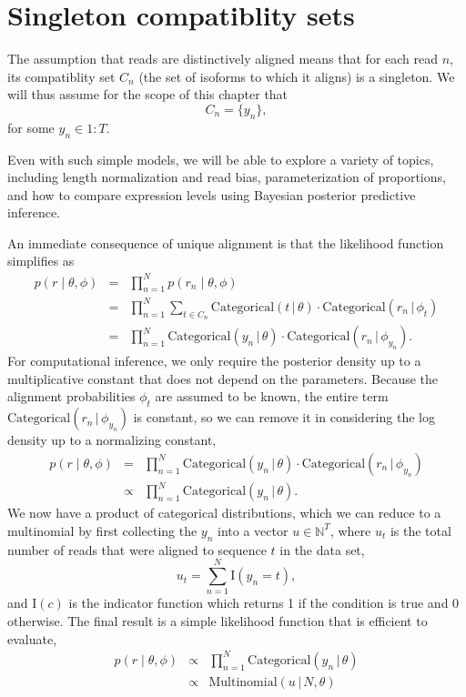 \documentclass[11pt]{report}
\newcommand{\rngto}[1]{1{:}#1}
\newcommand{\setlist}[1]{\{ #1 \}}
\newcommand{\indicator}[1]{\textrm{I}\!\left( #1 \right)}
\newcommand{\distro}[3]{\textrm{#1}\!\left( #2 \,|\, #3\right)}
\begin{document}
\section{Singleton compatiblity sets}

The assumption that reads are distinctively aligned means that for
each read $n$, its compatiblity set $C_n$ (the set of isoforms to
which it aligns) is a singleton.  We will thus assume for the scope of
this chapter that
\[
  C_n = \setlist{y_n},
\]
for some $y_n \in \rngto{T}$.

Even with such simple models, we will be able to explore a variety of
topics, including length normalization and read bias, parameterization
of proportions, and how to compare expression levels using Bayesian
posterior predictive inference.

An immediate consequence of unique alignment is that the likelihood function
simplifies as
\begin{eqnarray*}
  p(r \mid \theta, \phi)
  & = & \textstyle
        \prod_{n=1}^N p(r_n \mid \theta, \phi)
  \\[4pt]
  & = & \textstyle
        \prod_{n=1}^N \sum_{t \in C_n} \distro{Categorical}{t}{\theta}
        \cdot \distro{Categorical}{r_n}{\phi_t}
  \\[4pt]
  & = & \textstyle
        \prod_{n=1}^N \distro{Categorical}{y_n}{\theta}
        \cdot \distro{Categorical}{r_n}{\phi_{y_n}}.
\end{eqnarray*}
%
For computational inference, we only require the posterior density up
to a multiplicative constant that does not depend on the parameters.
Because the alignment probabilities $\phi_t$ are assumed to be
known, the entire term $\distro{Categorical}{r_n}{\phi_{y_n}}$
is constant, so we can remove it in considering the log density up to
a normalizing constant,
%
\begin{eqnarray*}
   p(r \mid \theta, \phi)
  & = & \textstyle
        \prod_{n=1}^N \distro{Categorical}{y_n}{\theta}
        \cdot \distro{Categorical}{r_n}{\phi_{y_n}}
  \\[4pt]
  & \propto & \textstyle
              \prod_{n=1}^N \distro{Categorical}{y_n}{\theta}.
\end{eqnarray*}
%
We now have a product of categorical distributions, which we can
reduce to a multinomial by first collecting the $y_n$ into a vector
$u \in \mathbb{N}^T$, where
$u_t$ is the total number of reads that were aligned to
sequence $t$ in the data set, 
\[
  u_t = \sum_{n=1}^N \indicator{y_n = t},
\]
and $\indicator{c}$ is the indicator function which returns 1 if the
condition is true and 0 otherwise.  The final result is 
a simple likelihood function that is efficient to evaluate,
\begin{eqnarray*}
   p(r \mid \theta, \phi)
   & \propto & \textstyle
              \prod_{n=1}^N \distro{Categorical}{y_n}{\theta}
  \\[4pt]
              & \propto & \textstyle
  \distro{Multinomial}{u}{N, \theta}
\end{eqnarray*}
\end{document}
